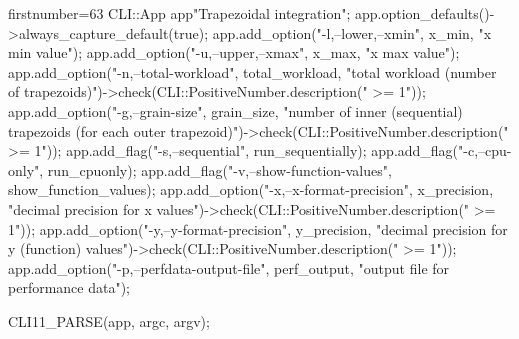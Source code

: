 \begin{cppcode*}{firstnumber=63}
    CLI::App app{"Trapezoidal integration"};
    app.option_defaults()->always_capture_default(true);
    app.add_option("-l,--lower,--xmin", x_min, "x min value");
    app.add_option("-u,--upper,--xmax", x_max, "x max value");
    app.add_option("-n,--total-workload", total_workload, "total workload (number of trapezoids)")->check(CLI::PositiveNumber.description(" >= 1"));
    app.add_option("-g,--grain-size", grain_size, "number of inner (sequential) trapezoids (for each outer trapezoid)")->check(CLI::PositiveNumber.description(" >= 1"));
    app.add_flag("-s,--sequential", run_sequentially);
    app.add_flag("-c,--cpu-only", run_cpuonly);
    app.add_flag("-v,--show-function-values", show_function_values);
    app.add_option("-x,--x-format-precision", x_precision, "decimal precision for x values")->check(CLI::PositiveNumber.description(" >= 1"));
    app.add_option("-y,--y-format-precision", y_precision, "decimal precision for y (function) values")->check(CLI::PositiveNumber.description(" >= 1"));
    app.add_option("-p,--perfdata-output-file", perf_output, "output file for performance data");

    CLI11_PARSE(app, argc, argv);
\end{cppcode*}
